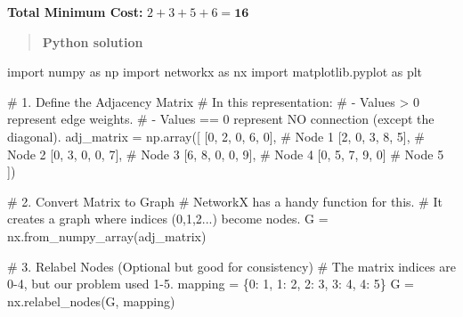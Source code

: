\documentclass[
  letterpaper,
  DIV=11,
  numbers=noendperiod]{scrreprt}
\newenvironment{Shaded}{\begin{snugshade}}{\end{snugshade}}
\newcommand{\CommentTok}[1]{\textcolor[rgb]{0.37,0.37,0.37}{#1}}
\newcommand{\DecValTok}[1]{\textcolor[rgb]{0.68,0.00,0.00}{#1}}
\newcommand{\ImportTok}[1]{\textcolor[rgb]{0.00,0.46,0.62}{#1}}
\newcommand{\NormalTok}[1]{\textcolor[rgb]{0.00,0.23,0.31}{#1}}
\newcommand{\OperatorTok}[1]{\textcolor[rgb]{0.37,0.37,0.37}{#1}}
\begin{document}
\textbf{Total Minimum Cost:} \(2 + 3 + 5 + 6 = \mathbf{16}\)

\begin{quote}
\textbf{Python solution}
\end{quote}

\begin{Shaded}
\begin{Highlighting}[]
\ImportTok{import}\NormalTok{ numpy }\ImportTok{as}\NormalTok{ np}
\ImportTok{import}\NormalTok{ networkx }\ImportTok{as}\NormalTok{ nx}
\ImportTok{import}\NormalTok{ matplotlib.pyplot }\ImportTok{as}\NormalTok{ plt}

\CommentTok{\# 1. Define the Adjacency Matrix}
\CommentTok{\# In this representation:}
\CommentTok{\# {-} Values \textgreater{} 0 represent edge weights.}
\CommentTok{\# {-} Values == 0 represent NO connection (except the diagonal).}
\NormalTok{adj\_matrix }\OperatorTok{=}\NormalTok{ np.array([}
\NormalTok{    [}\DecValTok{0}\NormalTok{, }\DecValTok{2}\NormalTok{, }\DecValTok{0}\NormalTok{, }\DecValTok{6}\NormalTok{, }\DecValTok{0}\NormalTok{],  }\CommentTok{\# Node 1}
\NormalTok{    [}\DecValTok{2}\NormalTok{, }\DecValTok{0}\NormalTok{, }\DecValTok{3}\NormalTok{, }\DecValTok{8}\NormalTok{, }\DecValTok{5}\NormalTok{],  }\CommentTok{\# Node 2}
\NormalTok{    [}\DecValTok{0}\NormalTok{, }\DecValTok{3}\NormalTok{, }\DecValTok{0}\NormalTok{, }\DecValTok{0}\NormalTok{, }\DecValTok{7}\NormalTok{],  }\CommentTok{\# Node 3}
\NormalTok{    [}\DecValTok{6}\NormalTok{, }\DecValTok{8}\NormalTok{, }\DecValTok{0}\NormalTok{, }\DecValTok{0}\NormalTok{, }\DecValTok{9}\NormalTok{],  }\CommentTok{\# Node 4}
\NormalTok{    [}\DecValTok{0}\NormalTok{, }\DecValTok{5}\NormalTok{, }\DecValTok{7}\NormalTok{, }\DecValTok{9}\NormalTok{, }\DecValTok{0}\NormalTok{]   }\CommentTok{\# Node 5}
\NormalTok{])}

\CommentTok{\# 2. Convert Matrix to Graph}
\CommentTok{\# NetworkX has a handy function for this. }
\CommentTok{\# It creates a graph where indices (0,1,2...) become nodes.}
\NormalTok{G }\OperatorTok{=}\NormalTok{ nx.from\_numpy\_array(adj\_matrix)}

\CommentTok{\# 3. Relabel Nodes (Optional but good for consistency)}
\CommentTok{\# The matrix indices are 0{-}4, but our problem used 1{-}5.}
\NormalTok{mapping }\OperatorTok{=}\NormalTok{ \{}\DecValTok{0}\NormalTok{: }\DecValTok{1}\NormalTok{, }\DecValTok{1}\NormalTok{: }\DecValTok{2}\NormalTok{, }\DecValTok{2}\NormalTok{: }\DecValTok{3}\NormalTok{, }\DecValTok{3}\NormalTok{: }\DecValTok{4}\NormalTok{, }\DecValTok{4}\NormalTok{: }\DecValTok{5}\NormalTok{\}}
\NormalTok{G }\OperatorTok{=}\NormalTok{ nx.relabel\_nodes(G, mapping)}


\end{Highlighting}
\end{Shaded}
\end{document}
